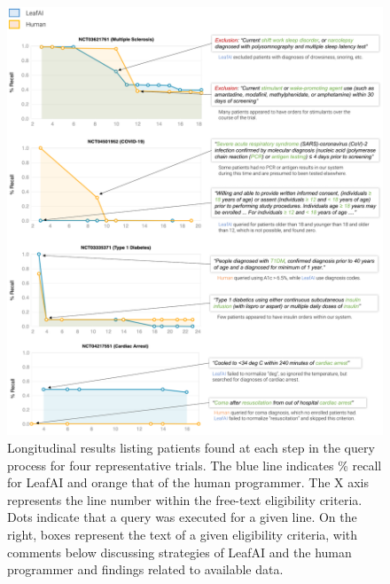 \documentclass[../main.tex]{subfiles}
\begin{document}
\begin{figure}[H]
  \begin{center}
    \includegraphics[scale=0.51]{figures/leafai_paper2_analysis0.pdf}  
  \end{center}
  \caption{Longitudinal results listing patients found at each step in the query process for four representative trials. The blue line indicates \% recall for LeafAI and orange that of the human programmer. The X axis represents the line number within the free-text eligibility criteria. Dots indicate that a query was executed for a given line. On the right, boxes represent the text of a given eligibility criteria, with comments below discussing strategies of LeafAI and the human programmer and findings related to available data.}
  \label{fig_leafai_results_analysis}
\end{figure}
\end{document}

